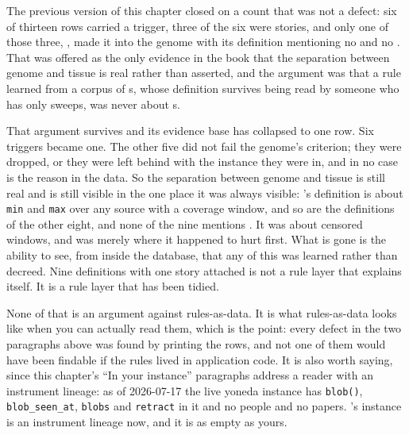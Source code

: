 The previous version of this chapter closed on a count that was not a defect: six of thirteen rows carried a trigger, three of the six were \labDomain{} stories, and only one of those three, , made it into the genome with its definition mentioning no \labPriorUnit{} and no \labPriorField. That was offered as the only evidence in the book that the separation between genome and tissue is real rather than asserted, and the argument was that a rule learned from a corpus of \labPriorUnit{}s, whose definition survives being read by someone who has only sweeps, was never about \labPriorUnit{}s.

That argument survives and its evidence base has collapsed to one row. Six triggers became one. The other five did not fail the genome's criterion; they were dropped, or they were left behind with the instance they were in, and in no case is the reason in the data. So the separation between genome and tissue is still real and is still visible in the one place it was always visible: 's definition is about \texttt{min} and \texttt{max} over any source with a coverage window, and so are the definitions of the other eight, and none of the nine mentions \labDomain. It was about censored windows, and \labDomain{} was merely where it happened to hurt first. What is gone is the ability to see, from inside the database, that any of this was learned rather than decreed. Nine definitions with one story attached is not a rule layer that explains itself. It is a rule layer that has been tidied.

None of that is an argument against rules-as-data. It is what rules-as-data looks like when you can actually read them, which is the point: every defect in the two paragraphs above was found by printing the rows, and not one of them would have been findable if the rules lived in application code. It is also worth saying, since this chapter's ``In your instance'' paragraphs address a reader with an instrument lineage: as of 2026-07-17 the live yoneda instance has \texttt{blob()}, \texttt{blob\_seen\_at}, \texttt{blobs} and \texttt{retract} in it and no people and no papers. \labPI's instance is an instrument lineage now, and it is as empty as yours.

